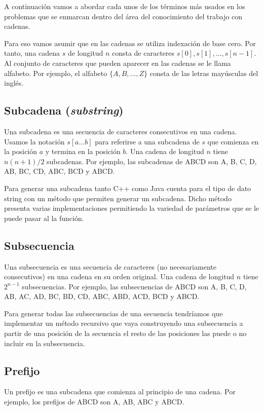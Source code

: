 A continuación vamos a abordar cada unos de los términos más usados en los problemas que se enmarcan dentro del área del conocimiento del trabajo con cadenas.

Para eso vamos asumir que en las cadenas se utiliza indexación de base cero. Por tanto, una cadena $s$ de longitud $n$ consta de caracteres $s[0], s[1],\dots , s[n-1]$. Al conjunto de caracteres que pueden aparecer en las cadenas se le llama alfabeto. Por ejemplo, el alfabeto $\{A, B, \dots , Z\}$ consta de las letras mayúsculas del inglés.

\subsection{Subcadena (\emph{substring})}
Una subcadena es una secuencia de caracteres consecutivos en una cadena. Usamos la notación $s[a \dots b]$ para referirse a una subcadena de $s$ que comienza en la posición $a$ y termina en la posición $b$. Una cadena de longitud $n$ tiene $n(n+1)/2$ subcadenas. Por ejemplo, las subcadenas de ABCD son A, B, C, D, AB, BC, CD, ABC, BCD y ABCD.

Para generar una subcadena tanto C++ como Java cuenta para el tipo de dato string con un método que  permiten generar un subcadena. Dicho método presenta varias implementaciones permitiendo la variedad de parámetros que se le puede pasar al la función.

\subsection{Subsecuencia}

Una subsecuencia es una secuencia de caracteres (no necesariamente consecutivos) en una cadena en su orden original. Una cadena de longitud $n$ tiene $2^{n-1}$ subsecuencias. Por ejemplo, las subsecuencias de ABCD son A, B, C, D, AB, AC, AD, BC, BD, CD, ABC, ABD, ACD, BCD y ABCD.

Para generar todas las subsecuencias de una secuencia tendríamos que implementar un método recursivo que vaya construyendo una subsecuencia a partir de una posición de la secuencia  el resto de las posiciones las puede o no incluir en la subsecuencia.


\subsection{Prefijo}
Un prefijo es una subcadena que comienza al principio de una cadena. Por ejemplo, los prefijos de ABCD son A, AB, ABC y ABCD. 

